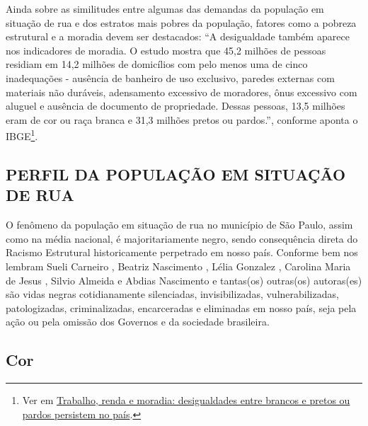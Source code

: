 \documentclass[14pt]{extarticle}
\begin{document}

Ainda sobre as similitudes entre algumas das demandas da população em situação de rua e dos estratos mais pobres da população, fatores como a pobreza estrutural e a moradia devem ser destacados: ``A desigualdade também aparece nos indicadores de moradia. O estudo mostra que 45,2 milhões de pessoas residiam em 14,2 milhões de domicílios com pelo menos uma de cinco inadequações - ausência de banheiro de uso exclusivo, paredes externas com materiais não duráveis, adensamento excessivo de moradores, ônus excessivo com aluguel e ausência de documento de propriedade. Dessas pessoas, 13,5 milhões eram de cor ou raça branca e 31,3 milhões pretos ou pardos.'', conforme aponta o IBGE\footnote{Ver em \href{https://agenciadenoticias.ibge.gov.br/agencia-noticias/2012-agencia-de-noticias/noticias/29433-trabalho-renda-e-moradia-desigualdades-entre-brancos-e-pretos-ou-pardos-persistem-no-pais}{Trabalho, renda e moradia: desigualdades entre brancos e pretos ou pardos persistem no país}.}. 

\newpage



\begin{center}
\section{PERFIL DA POPULAÇÃO EM SITUAÇÃO DE RUA}
\end{center}
\label{parte_3}
\vspace{1cm}

O fenômeno da população em situação de rua no município de São Paulo, assim como na média nacional, é majoritariamente negro, sendo consequência direta do Racismo Estrutural historicamente perpetrado em nosso país. Conforme bem nos lembram Sueli Carneiro \citep{carneiro}, Beatriz Nascimento \citep{beatriz}, Lélia Gonzalez \citep{lelia}, Carolina Maria de Jesus \citep{carolina_jesus}, Silvio Almeida \citep{silvio_almeida} e Abdias Nascimento \citep{abdias} e tantas(os) outras(os) autoras(es) são vidas negras cotidianamente silenciadas, invisibilizadas, vulnerabilizadas, patologizadas, criminalizadas, encarceradas e eliminadas em nosso país, seja pela ação ou pela omissão dos Governos e da sociedade brasileira.\\

\subsection{Cor}
\label{cor}
\end{document}
